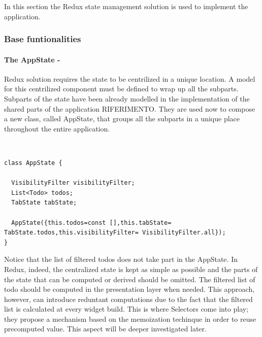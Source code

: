 In this section the Redux state management solution is used to implement the application.
\subsubsection{Base funtionalities}  \label{par:todo_app_inherited_widget_introduction}
\paragraph{The AppState - }
\label{subpar:todo_app_bloc_core_state}
Redux solution requires the state to be centrilized in a unique location. A model for this centrilized component must be defined to wrap up all the subparts. Subparts of the state have been already modelled in the implementation of the shared parts of the application RIFERIMENTO. They are used now to compose a new class, called AppState, that groups all the subparts in a unique place throughout the entire application. 
\begin{code}
\mbox{}\\
 \mbox{}
		\label{code:2.14}
\begin{verbatim}
class AppState {

  VisibilityFilter visibilityFilter;
  List<Todo> todos;
  TabState tabState;

  AppState({this.todos=const [],this.tabState= TabState.todos,this.visibilityFilter= VisibilityFilter.all});
}
\end{verbatim}
\mbox{}
\end{code}

Notice that the list of filtered todos does not take part in the AppState. In Redux, indeed, the centralized state is kept as simple as possible and the parts of the state that can be computed or derived should be omitted. The filtered list of todo should be computed in the presentation layer when needed. This approach, however, can introduce reduntant computations due to the fact that the filtered list is calculated at every widget build. This is where Selectors come into play; they propose a mechanism based on the memoization techinque in order to reuse precomputed value. This aspect will be deeper investigated later.

